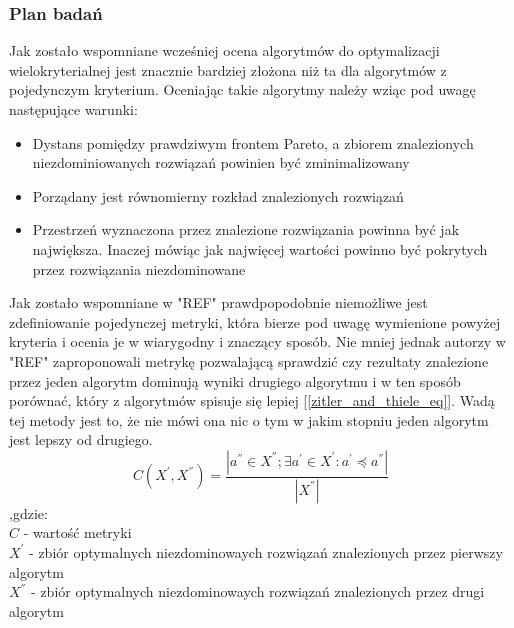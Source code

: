 \documentclass[twoside]{iisthesis}
\begin{document}
\subsubsection{Plan badań}
Jak zostało wspomniane wcześniej ocena algorytmów do optymalizacji wielokryterialnej jest znacznie bardziej złożona niż ta dla algorytmów z pojedynczym kryterium. Oceniając takie algorytmy należy wziąc pod uwagę następujące warunki:
\begin{itemize}
	\item Dystans pomiędzy prawdziwym frontem Pareto, a zbiorem znalezionych niezdominiowanych rozwiązań powinien być zminimalizowany
	\item Porządany jest równomierny rozkład znalezionych rozwiązań
	\item Przestrzeń wyznaczona przez znalezione rozwiązania powinna być jak największa. Inaczej mówiąc jak najwięcej wartości powinno być pokrytych przez rozwiązania niezdominowane
\end{itemize}
Jak zostało wspomniane w "REF" prawdpopodobnie niemożliwe jest zdefiniowanie pojedynczej metryki, która bierze pod uwagę wymienione powyżej kryteria i ocenia je w wiarygodny i znaczący sposób. Nie mniej jednak autorzy w "REF" zaproponowali metrykę pozwalającą sprawdzić czy rezultaty znalezione przez jeden algorytm dominują wyniki drugiego algorytmu i w ten sposób porównać, który z algorytmów spisuje się lepiej [\ref{zitler_and_thiele_eq}]. Wadą tej metody jest to, że nie mówi ona nic o tym w jakim stopniu jeden algorytm jest lepszy od drugiego.\\

\begin{equation}
\label{zitler_and_thiele_eq}
C(X^{'}, X^{''}) = \dfrac{|a^{''} \in X^{''}; \exists a^{'} \in X^{'}: a^{'} \preceq a^{''	}|}{|X^{''}|}
\end{equation}
,gdzie:\\
$C$ - wartość metryki\\
$X^{'}$ - zbiór optymalnych niezdominowaych rozwiązań znalezionych przez pierwszy algorytm\\
$X^{''}$ - zbiór optymalnych niezdominowaych rozwiązań znalezionych przez drugi algorytm\\
\end{document}
